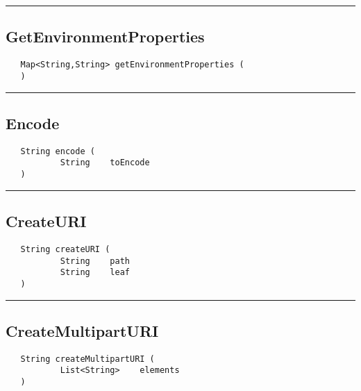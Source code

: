 \rule{15cm}{2pt}
\subsection{GetEnvironmentProperties}
\label{Api:GetEnvironmentProperties}
\begin{verbatim}
   Map<String,String> getEnvironmentProperties (
   )
\end{verbatim}



\rule{15cm}{2pt}
\subsection{Encode}
\label{Api:Encode}
\begin{verbatim}
   String encode (
           String    toEncode
   )
\end{verbatim}



\rule{15cm}{2pt}
\subsection{CreateURI}
\label{Api:CreateURI}
\begin{verbatim}
   String createURI (
           String    path
           String    leaf
   )
\end{verbatim}



\rule{15cm}{2pt}
\subsection{CreateMultipartURI}
\label{Api:CreateMultipartURI}
\begin{verbatim}
   String createMultipartURI (
           List<String>    elements
   )
\end{verbatim}




